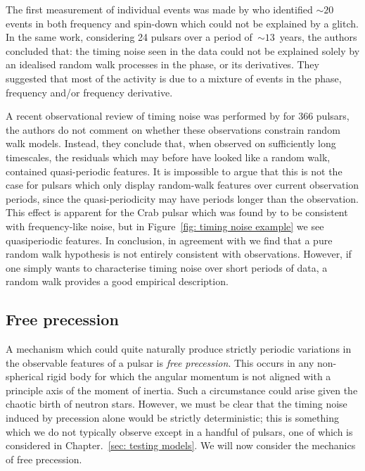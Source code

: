 The first measurement of individual events was made by \citet{Cordes1985} who
identified $\sim20$ events in both frequency and spin-down which could not be
explained by a glitch. In the same work, considering 24 pulsars over a period
of~$\sim13$~years, the authors concluded that: the timing noise seen in the
data could not be explained solely by an idealised random walk processes in the
phase, or its derivatives. They suggested that most of the activity is due to a
mixture of events in the phase, frequency and/or frequency derivative.

A recent observational review of timing noise was performed by
\citet{Hobbs2010} for 366 pulsars, the authors do not comment on whether these
observations constrain random walk models. Instead, they conclude that, when
observed on sufficiently long timescales, the residuals which may before have
looked like a random walk, contained quasi-periodic features. It is impossible
to argue that this is not the case for pulsars which only display random-walk
features over current observation periods, since the quasi-periodicity may have
periods longer than the observation. This effect is apparent for the Crab
pulsar which was found by \citet{Boynton1972} to be consistent with
frequency-like noise, but in Figure~\ref{fig: timing noise example} we
see quasiperiodic features. In conclusion, in agreement with \citet{Hobbs2010}
we find that a pure random walk hypothesis is not entirely consistent with
observations. However, if one simply wants to characterise timing noise over
short periods of data, a random walk provides a good empirical description.

\subsection{Free precession}
\label{sec: free precession}

A mechanism which could quite naturally produce strictly periodic variations in
the observable features of a pulsar is \emph{free precession}. This occurs in
any non-spherical rigid body for which the angular momentum is not aligned with a
principle axis of the moment of inertia. Such a circumstance could arise given
the chaotic birth of neutron stars. However, we must be clear that the timing noise
induced by precession alone would be strictly deterministic; this is something
which we do not typically observe except in a handful of pulsars, one of which
is considered in Chapter.~\ref{sec: testing models}. We will now
consider the mechanics of free precession.

